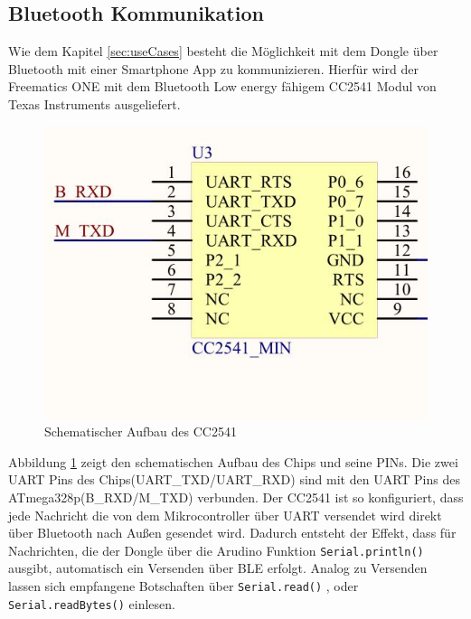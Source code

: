 \subsection{Bluetooth Kommunikation}
\label{sec:Bluetooth}
Wie dem Kapitel \ref{sec:useCases} besteht die Möglichkeit mit dem Dongle über Bluetooth mit einer Smartphone App zu kommunizieren. Hierfür wird der Freematics ONE mit dem Bluetooth Low energy fähigem CC2541 Modul von Texas Instruments ausgeliefert.
\begin{figure}[H]
  \begin{center}
    \includegraphics[scale=0.5]{./img/BLEChip.jpg}
    \caption{Schematischer Aufbau des CC2541\cite{Freematics2016}}
    \label{fig:BLEChip}
  \end{center}
\end{figure} 
Abbildung \ref{fig:BLEChip} zeigt den schematischen Aufbau des Chips und seine PINs. Die zwei UART Pins des Chips(UART\_TXD/UART\_RXD) sind mit den UART Pins des ATmega328p(B\_RXD/M\_TXD) verbunden. Der CC2541 ist so konfiguriert, dass jede Nachricht die von dem Mikrocontroller über UART versendet wird direkt über Bluetooth nach Außen gesendet wird. Dadurch entsteht der Effekt, dass für Nachrichten, die der Dongle über die Arudino Funktion \texttt{Serial.println()} ausgibt, automatisch ein Versenden über BLE erfolgt. Analog zu Versenden lassen sich empfangene Botschaften über \texttt{Serial.read()} , oder \texttt{Serial.readBytes()} einlesen.

